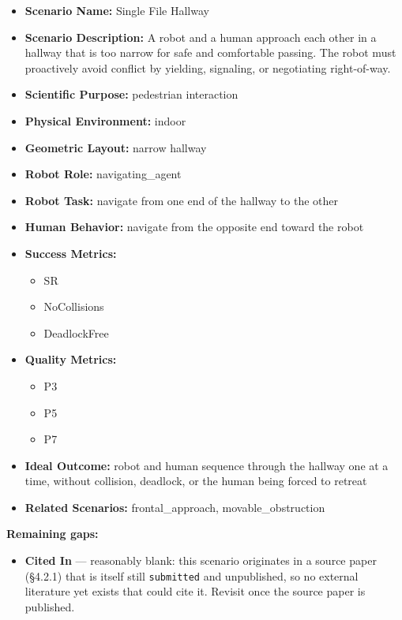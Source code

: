 \documentclass[utf8]{frontiers_suppmat} %
\providecommand{\tightlist}{%
  \setlength{\itemsep}{0pt}\setlength{\parskip}{0pt}}
\begin{document}
\begin{itemize}
\tightlist
\item
  \textbf{Scenario Name:} Single File Hallway
\item
  \textbf{Scenario Description:} A robot and a human approach each other
  in a hallway that is too narrow for safe and comfortable passing. The
  robot must proactively avoid conflict by yielding, signaling, or
  negotiating right-of-way.
\item
  \textbf{Scientific Purpose:} pedestrian interaction
\item
  \textbf{Physical Environment:} indoor
\item
  \textbf{Geometric Layout:} narrow hallway
\item
  \textbf{Robot Role:} navigating\_agent
\item
  \textbf{Robot Task:} navigate from one end of the hallway to the other
\item
  \textbf{Human Behavior:} navigate from the opposite end toward the
  robot
\item
  \textbf{Success Metrics:}

  \begin{itemize}
  \tightlist
  \item
    SR
  \item
    NoCollisions
  \item
    DeadlockFree
  \end{itemize}
\item
  \textbf{Quality Metrics:}

  \begin{itemize}
  \tightlist
  \item
    P3
  \item
    P5
  \item
    P7
  \end{itemize}
\item
  \textbf{Ideal Outcome:} robot and human sequence through the hallway
  one at a time, without collision, deadlock, or the human being forced
  to retreat
\item
  \textbf{Related Scenarios:} frontal\_approach, movable\_obstruction
\end{itemize}

\textbf{Remaining gaps:}

\begin{itemize}
\tightlist
\item
  \textbf{Cited In} --- reasonably blank: this scenario originates in a
  source paper (§4.2.1) that is itself still \texttt{submitted} and
  unpublished, so no external literature yet exists that could cite it.
  Revisit once the source paper is published.
\end{itemize}
\end{document}
